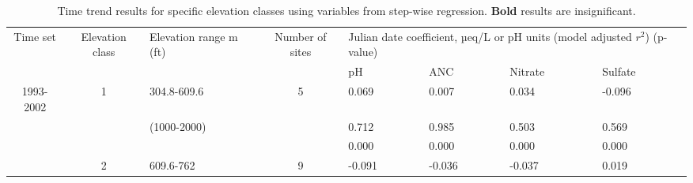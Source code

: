 \begin{table}[p]\scriptsize
\caption{Time trend results for specific elevation classes using variables from step-wise regression. \textbf{Bold} results are insignificant.}
\begin{tabular}{cclcllll}
\toprule
\multicolumn{1}{m{.5cm}}{Time set} & \multicolumn{1}{m{1cm}}{Elevation class} &\multicolumn{1}{m{2cm}}{ Elevation range m (ft)} & \multicolumn{1}{m{1cm}}{Number of sites} & \multicolumn{4}{m{8cm}}{Julian date coefficient, µeq/L or pH units (model adjusted $r^2$) (p-value)}   \\ \cline{5-8}\noalign{\smallskip}
                                                               &                                                                 &                                                                                &                                                                       & \multicolumn{ 1}{m{2cm}}{pH} & \multicolumn{1}{m{2cm}}{ANC} & \multicolumn{1}{m{2cm}}{Nitrate} & \multicolumn{1}{m{2cm}}{Sulfate} \\ 
 \hline\noalign{\smallskip}
1993-2002                                              & 1                                                              & 304.8-609.6                                                           & 5                                                                    &  0.069                                       & 0.007                                          & 0.034                                              & -0.096  \\ 
                                                               &                                                                 & (1000-2000)                                                           &                                                                       &  0.712                                       & 0.985                                           & 0.503                                             & 0.569  \\ 
                                                               &                                                                 &                                                                                &                                                                        &  0.000                                      & 0.000                                           & 0.000                                              & 0.000  \\ \cline{5-8}\noalign{\smallskip}
                                                               &  2                                                             & 609.6-762                                                              & 9                                                                     &  -0.091                                     & -0.036                                         & -0.037                                             & 0.019  \\ 

\end{tabular}
\end{table}
